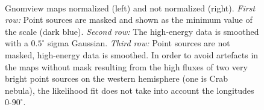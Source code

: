 \documentclass[a4paper]{article}
\begin{document}
\begin{figure}[h]
{\begin{subfigure}[b]{.5\textwidth}
	\end{subfigure}%
	}\\
\caption{Gnomview maps normalized (left) and not normalized (right). \textit{First row:} Point sources are masked and shown as the minimum value of the scale (dark blue). \textit{Second row:} The high-energy data is smoothed with a $0.5^\circ$ sigma Gaussian. \textit{Third row:} Point sources are not masked, high-energy data is smoothed. In order to avoid artefacts in the maps without mask resulting from the high fluxes of two very bright point sources on the western hemisphere (one is Crab nebula), the likelihood fit does not take into account the longitudes 0-$90^\circ$.}
\label{Fit_IC_pi0_to_ROI}
\end{figure}



\begin{figure}[h]
\end{figure}
\end{document}
